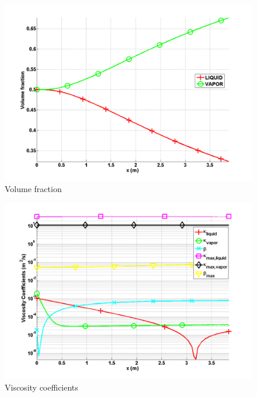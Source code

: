         \begin{figure}[H]
                \centering
                \includegraphics[width=\textwidth]{figures/ANS_WINTER_2014_7Eqn_volume_fraction.png}
                \caption{Volume fraction}
                \label{fig:volume_fraction}
        \end{figure}        
%
        \begin{figure}[H]
                \centering
                \includegraphics[width=\textwidth]{figures/ANS_WINTER_2014_7Eqn_viscosity.png}
                \caption{Viscosity coefficients}
                \label{fig:viscosity_coeff}
        \end{figure}        
%
